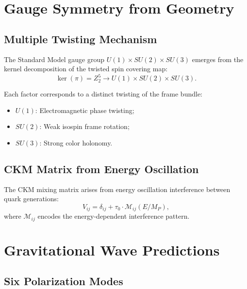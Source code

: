 \documentclass[aps,prd,reprint,superscriptaddress,amsmath,amssymb]{revtex4-2}
\begin{document}
\section{Gauge Symmetry from Geometry}
\label{sec:gauge}

\subsection{Multiple Twisting Mechanism}

The Standard Model gauge group $U(1) \times SU(2) \times SU(3)$ emerges from the kernel decomposition of the twisted spin covering map:
\begin{equation}
    \ker(\pi) = Z_2^5 \rightarrow U(1) \times SU(2) \times SU(3).
\end{equation}

Each factor corresponds to a distinct twisting of the frame bundle:
\begin{itemize}
    \item $U(1)$: Electromagnetic phase twisting;
    \item $SU(2)$: Weak isospin frame rotation;
    \item $SU(3)$: Strong color holonomy.
\end{itemize}

\subsection{CKM Matrix from Energy Oscillation}

The CKM mixing matrix arises from energy oscillation interference between quark generations:
\begin{equation}
    V_{ij} = \delta_{ij} + \tau_0 \cdot \mathcal{M}_{ij}(E/M_P),
\end{equation}
where $\mathcal{M}_{ij}$ encodes the energy-dependent interference pattern.

\section{Gravitational Wave Predictions}
\label{sec:gw}

\subsection{Six Polarization Modes}
\end{document}
